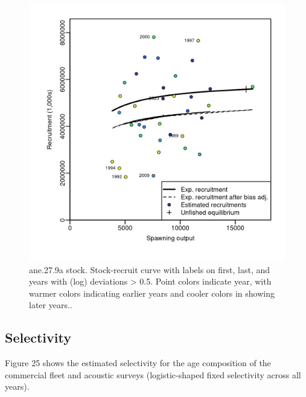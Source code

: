\documentclass[
]{article}
\begin{document}
\begin{figure}[H]

{\centering \includegraphics[width=0.95\linewidth]{report/run/S1.0_4FLEETS/fig_stock-recluta} 

}

\caption{ane.27.9a stock. Stock-recruit curve with labels on first, last, and years with (log) deviations > 0.5. Point colors indicate year, with warmer colors indicating earlier years and cooler colors in showing later years..}\label{fig:unnamed-chunk-31}
\end{figure}

\hypertarget{selectivity-1}{%
\subsection{Selectivity}\label{selectivity-1}}

Figure 25 shows the estimated selectivity for the age composition of the
commercial fleet and acoustic surveys (logistic-shaped fixed selectivity
across all years).
\end{document}
